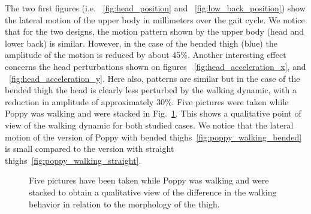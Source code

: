 The two first figures (i.e. ~\ref{fig:head_position} and ~\ref{fig:low_back_position}) show the lateral motion of the upper body in millimeters over the gait cycle. We notice that for the two designs, the motion pattern shown by the upper body (head and lower back) is similar. However, in the case of the bended thigh (blue) the amplitude of the motion is reduced by about 45\%. Another interesting effect concerns the head perturbations shown on figures ~\ref{fig:head_acceleration_x}, and ~\ref{fig:head_acceleration_y}. Here also, patterns are similar but in the case of the bended thigh the head is clearly less perturbed by the walking dynamic, with a reduction in amplitude of approximately 30\%. Five pictures were taken while Poppy was walking and were stacked in Fig.~\ref{fig:poppy_walking_compared}. This shows a qualitative point of view of the walking dynamic for both studied cases.
We notice that the lateral motion of the version of Poppy with bended thighs~\ref{fig:poppy_walking_bended} is small compared to the version with straight thighs~\ref{fig:poppy_walking_straight}.


\begin{figure}[h]
\centering
    \hfil
    \caption{Five pictures have been taken while Poppy was walking and were stacked to obtain a qualitative view of the difference in the walking behavior in relation to the morphology of the thigh.}
    \label{fig:poppy_walking_compared}
\end{figure}


